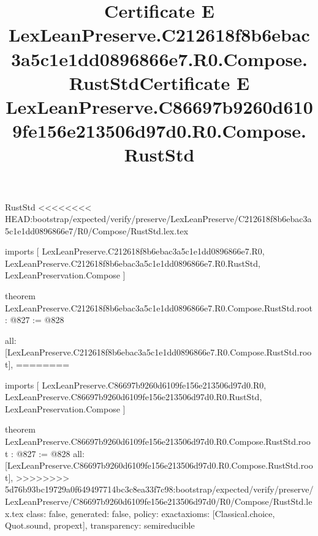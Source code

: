 \begin{lexlean}{RustStd}
<<<<<<<< HEAD:bootstrap/expected/verify/preserve/LexLeanPreserve/C212618f8b6ebac3a5c1e1dd0896866e7/R0/Compose/RustStd.lex.tex
\title{Certificate E LexLeanPreserve.C212618f8b6ebac3a5c1e1dd0896866e7.R0.Compose.RustStd}
\begin{coremodule}
imports [
  LexLeanPreserve.C212618f8b6ebac3a5c1e1dd0896866e7.R0,
  LexLeanPreserve.C212618f8b6ebac3a5c1e1dd0896866e7.R0.RustStd,
  LexLeanPreservation.Compose
]

theorem LexLeanPreserve.C212618f8b6ebac3a5c1e1dd0896866e7.R0.Compose.RustStd.root : @827 := @828 {
  all: [LexLeanPreserve.C212618f8b6ebac3a5c1e1dd0896866e7.R0.Compose.RustStd.root],
========
\title{Certificate E LexLeanPreserve.C86697b9260d6109fe156e213506d97d0.R0.Compose.RustStd}
\begin{coremodule}
imports [
  LexLeanPreserve.C86697b9260d6109fe156e213506d97d0.R0,
  LexLeanPreserve.C86697b9260d6109fe156e213506d97d0.R0.RustStd,
  LexLeanPreservation.Compose
]

theorem LexLeanPreserve.C86697b9260d6109fe156e213506d97d0.R0.Compose.RustStd.root : @827 := @828 {
  all: [LexLeanPreserve.C86697b9260d6109fe156e213506d97d0.R0.Compose.RustStd.root],
>>>>>>>> 5d76b93bc19729a0f649497714bc3c8ea33f7c98:bootstrap/expected/verify/preserve/LexLeanPreserve/C86697b9260d6109fe156e213506d97d0/R0/Compose/RustStd.lex.tex
  class: false,
  generated: false,
  policy: exact{axioms: [Classical.choice, Quot.sound, propext]},
  transparency: semireducible
}


\end{coremodule}}
\end{coremodule}
\end{lexlean}
